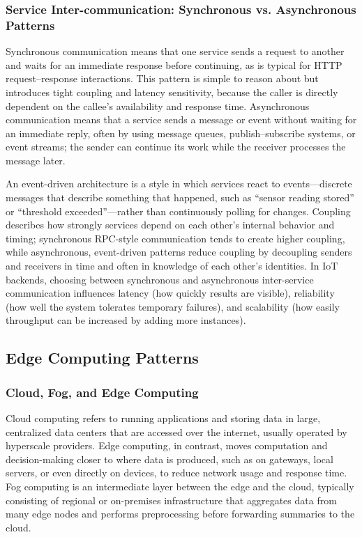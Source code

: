 \subsubsection{Service Inter-communication: Synchronous vs. Asynchronous Patterns}
Synchronous communication means that one service sends a request to another and waits for an immediate response before continuing, as is typical for HTTP request–response interactions. This pattern is simple to reason about but introduces tight coupling and latency sensitivity, because the caller is directly dependent on the callee’s availability and response time. Asynchronous communication means that a service sends a message or event without waiting for an immediate reply, often by using message queues, publish–subscribe systems, or event streams; the sender can continue its work while the receiver processes the message later.\cite{gfg_microservices_communication}

An event-driven architecture is a style in which services react to events—discrete messages that describe something that happened, such as “sensor reading stored” or “threshold exceeded”—rather than continuously polling for changes. Coupling describes how strongly services depend on each other’s internal behavior and timing; synchronous RPC-style communication tends to create higher coupling, while asynchronous, event-driven patterns reduce coupling by decoupling senders and receivers in time and often in knowledge of each other’s identities. In IoT backends, choosing between synchronous and asynchronous inter-service communication influences latency (how quickly results are visible), reliability (how well the system tolerates temporary failures), and scalability (how easily throughput can be increased by adding more instances).\cite{gfg_microservices_communication}

\subsection{Edge Computing Patterns}

\subsubsection{Cloud, Fog, and Edge Computing}
Cloud computing refers to running applications and storing data in large, centralized data centers that are accessed over the internet, usually operated by hyperscale providers. Edge computing, in contrast, moves computation and decision-making closer to where data is produced, such as on gateways, local servers, or even directly on devices, to reduce network usage and response time. Fog computing is an intermediate layer between the edge and the cloud, typically consisting of regional or on-premises infrastructure that aggregates data from many edge nodes and performs preprocessing before forwarding summaries to the cloud.

